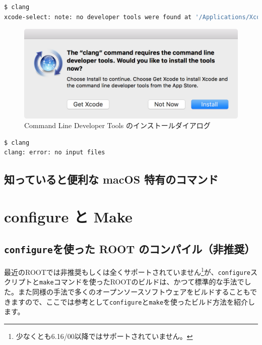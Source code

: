 \begin{lstlisting}[language=bash]
$ clang
xcode-select: note: no developer tools were found at '/Applications/Xcode.app', requesting install. Choose an option in the dialog to download the command line developer tools.
\end{lstlisting}

\begin{figure}
  \centering
  \includegraphics[scale=0.5]{fig/command-line-developer-tools.png}
  \caption{Command Line Developer Tools のインストールダイアログ}
  \label{fig:command-line-developer-tools}
\end{figure}

\begin{lstlisting}[language=bash]
$ clang
clang: error: no input files
\end{lstlisting}

\section{知っていると便利な macOS 特有のコマンド}

\chapter{configure と Make}
\label{chap:configure}

\section{\texttt{configure}を使った ROOT のコンパイル（非推奨）}
\label{sec:compile_configure}

最近のROOTでは非推奨もしくは全くサポートされていません\footnote{少なくとも6.16/00以降ではサポートされていません。}が、\texttt{configure}スクリプトと\texttt{make}コマンドを使ったROOTのビルドは、かつて標準的な手法でした。また同様の手法で多くのオープンソースソフトウェアをビルドすることもできますので、ここでは参考として\texttt{configure}と\texttt{make}を使ったビルド方法を紹介します。

